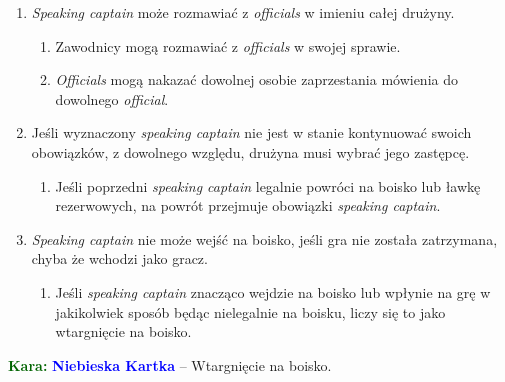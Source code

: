 \documentclass[11pt,a4paper]{article}
\newcommand\bluecard[1]{\bgroup\textcolor{darkgreen}{\textbf{Kara: }}\bgroup\textcolor{blue}{\textbf{Niebieska Kartka}} -- #1}
\begin{document}
\begin{enumerate}
  \item \emph{Speaking captain} może rozmawiać z
  \emph{officials} w imieniu całej drużyny.
  \begin{enumerate}
    \item Zawodnicy mogą rozmawiać z \emph{officials} w
    swojej sprawie.
    \item \emph{Officials} mogą nakazać dowolnej osobie
    zaprzestania mówienia do dowolnego \emph{official}.
  \end{enumerate}

  \item Jeśli wyznaczony \emph{speaking captain} nie jest w
  stanie kontynuować swoich obowiązków, z dowolnego względu,
  drużyna musi wybrać jego zastępcę.
  \begin{enumerate}
    \item Jeśli poprzedni \emph{speaking captain} legalnie
    powróci na boisko lub ławkę rezerwowych, na powrót
    przejmuje obowiązki \emph{speaking captain}.
  \end{enumerate}

  \item \emph{Speaking captain} nie może wejść na boisko,
  jeśli gra nie została zatrzymana, chyba że wchodzi jako 
  gracz.
  \begin{enumerate}
    \item Jeśli \emph{speaking captain} znacząco wejdzie na
    boisko lub wpłynie na grę w jakikolwiek sposób będąc
    nielegalnie na boisku, liczy się to jako wtargnięcie na
    boisko.
  \end{enumerate}
\end{enumerate}

\bluecard{Wtargnięcie na boisko.}
\end{document}
